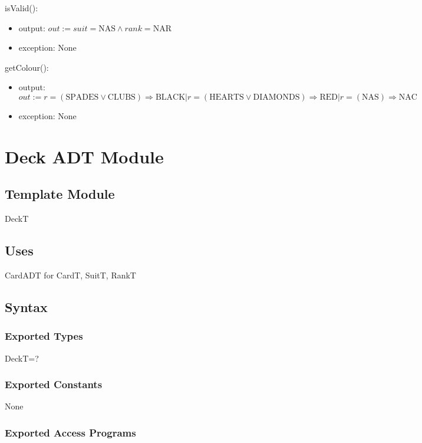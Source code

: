 \documentclass[12pt]{article}
\newcommand{\means}{\Rightarrow}
\newcommand{\m}[1]{\mbox{#1}}
\begin{document}
\noindent isValid():
\begin{itemize}
    \item output: $out := suit=\m{NAS} \land rank=\m{NAR}$
    \item exception: None
\end{itemize}

\noindent getColour():
\begin{itemize}
    \item output: $out := r=(\m{SPADES} \lor \m{CLUBS}) \means \m{BLACK} | r=(\m{HEARTS} \lor \m{DIAMONDS}) \means \m{RED} | r=(\m{NAS}) \means \m{NAC}$
    \item exception: None
\end{itemize}

\newpage

\section*{Deck ADT Module}

\subsection*{Template Module}

DeckT

\subsection*{Uses}

CardADT for CardT, SuitT, RankT\\

\subsection*{Syntax}

\subsubsection*{Exported Types}

DeckT=?

\subsubsection*{Exported Constants}

None

\subsubsection*{Exported Access Programs}
\end{document}

